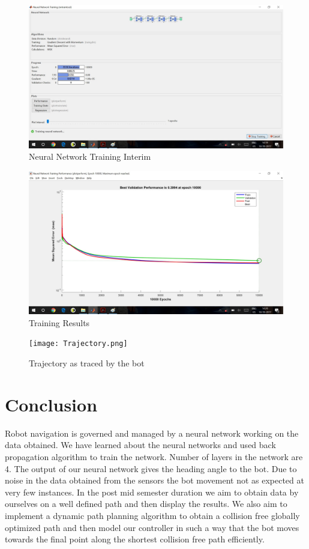 \documentclass[a4paper, 12pt]{article}
\begin{document}
\begin{figure}[!h]
\includegraphics[height =3 in, width = \linewidth]{Neural_Train.png}
\caption{Neural Network Training Interim}
\label{fig5}
\end{figure}
\begin{figure}[!h]
\includegraphics[height =3 in, width = \linewidth]{Performance_Graph.png}
\caption{Training Results}
\label{fig6}
\end{figure} 
\begin{figure}[!h]
\texttt{[image: Trajectory.png]}
\caption{Trajectory as traced by the bot}
\label{fig7}
\end{figure}
\newpage

\section{Conclusion}
Robot navigation is governed and managed by a neural network working on the data obtained. We have learned about the neural networks and used back propagation algorithm to train the network. Number of layers in the network are 4. The output of our neural network gives the heading angle to the bot. Due to noise in the data obtained from the sensors the bot movement not as expected at very few instances. 
In the post mid semester duration we aim to obtain data by ourselves on a well defined path and then display the results. We also aim to implement a dynamic path planning algorithm to obtain a collision free globally optimized path and then model our controller in such a way that the bot moves towards the final point along the shortest collision free path efficiently.
\end{document}
